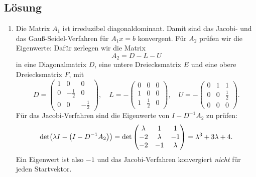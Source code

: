 \documentclass{exercise}
\begin{document}
    \subsection*{Lösung}
    \begin{enumerate}
        \item Die Matrix \(A_1\) ist irreduzibel diagonaldominant.
        Damit sind das Jacobi- und das Gauß-Seidel-Verfahren für \(A_1 x = b\) konvergent.
        Für \(A_2\) prüfen wir die Eigenwerte: Dafür zerlegen wir die Matrix
        \[
            A_2 = D - L - U
        \]
        in eine Diagonalmatrix \(D\), eine untere Dreiecksmatrix \(E\) und eine obere Dreiecksmatrix \(F\), mit
        \[
            D = \begin{pmatrix}
                1 & 0 & 0\\
                0 & -\frac{1}{2} & 0\\
                0 & 0 & -\frac{1}{2}
            \end{pmatrix}, \quad L = -\begin{pmatrix}
                0 & 0 & 0\\
                1 & 0 & 0\\
                1 & \frac{1}{2} & 0
            \end{pmatrix}, \quad U = -\begin{pmatrix}
                0 & 1 & 1\\
                0 & 0 & \frac{1}{2}\\
                0 & 0 & 0
            \end{pmatrix}.
        \]
        Für das Jacobi-Verfahren sind die Eigenwerte von \(I - D^{-1}A_2\) zu prüfen:
        \[
            \det\parentheses*{\lambda I - \parentheses*{I - D^{-1}A_2}} = \det\begin{pmatrix}
                \lambda & 1 & 1\\
                -2 & \lambda & -1\\
                -2 & -1 & \lambda
            \end{pmatrix} = \lambda^3 + 3\lambda + 4.
        \]
        Ein Eigenwert ist also \(-1\) und das Jacobi-Verfahren konvergiert \emph{nicht} für jeden Startvektor.
        

\end{enumerate}
\end{document}
